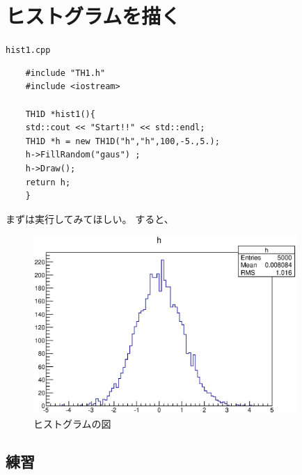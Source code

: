   \clearpage
 \section{ヒストグラムを描く}

 \begin{itembox}{\texttt{hist1.cpp}}
\begin{verbatim}
	#include "TH1.h"
	#include <iostream>

	TH1D *hist1(){
	std::cout << "Start!!" << std::endl;
	TH1D *h = new TH1D("h","h",100,-5.,5.);
	h->FillRandom("gaus") ;
	h->Draw();
	return h;
	}
\end{verbatim}
 \end{itembox}

 まずは実行してみてほしい。
 すると、
 \begin{figure}[htbp]
  \begin{center}
   \includegraphics[width = 100mm]{./picture/hist1canvas1.eps}
  \end{center}
  \caption{ヒストグラムの図}
  \label{Fig:hist1canvas1}
 \end{figure}

  \subsection{練習}

